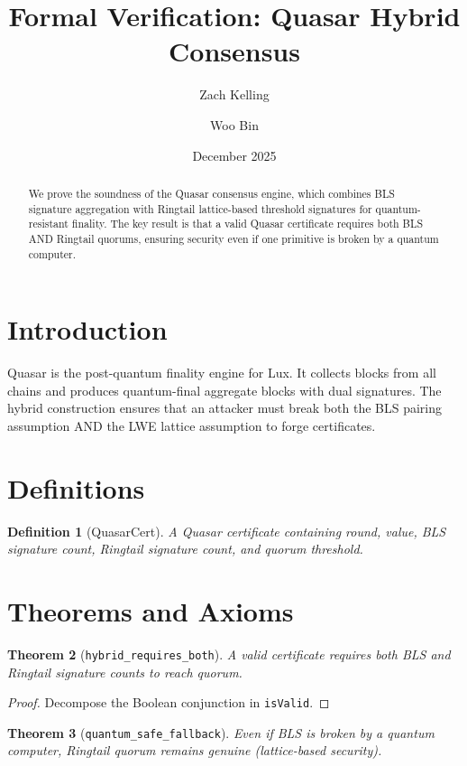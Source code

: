 \documentclass[11pt]{article}
\title{Formal Verification: Quasar Hybrid Consensus}
\author{Zach Kelling \and Woo Bin}
\date{December 2025}
\newtheorem{theorem}{Theorem}
\newtheorem{definition}[theorem]{Definition}
\begin{document}
\maketitle

\begin{abstract}
We prove the soundness of the Quasar consensus engine, which combines BLS signature aggregation with Ringtail lattice-based threshold signatures for quantum-resistant finality. The key result is that a valid Quasar certificate requires both BLS AND Ringtail quorums, ensuring security even if one primitive is broken by a quantum computer.
\end{abstract}

\section{Introduction}
Quasar is the post-quantum finality engine for Lux. It collects blocks from all chains and produces quantum-final aggregate blocks with dual signatures. The hybrid construction ensures that an attacker must break both the BLS pairing assumption AND the LWE lattice assumption to forge certificates.

\section{Definitions}
\begin{definition}[QuasarCert]
A Quasar certificate containing round, value, BLS signature count, Ringtail signature count, and quorum threshold.
\end{definition}


\section{Theorems and Axioms}
\begin{theorem}[\texttt{hybrid\_requires\_both}]
A valid certificate requires both BLS and Ringtail signature counts to reach quorum.
\end{theorem}
\begin{proof}
Decompose the Boolean conjunction in \texttt{isValid}.
\end{proof}

\begin{theorem}[\texttt{quantum\_safe\_fallback}]
Even if BLS is broken by a quantum computer, Ringtail quorum remains genuine (lattice-based security).
\end{theorem}
\end{document}
